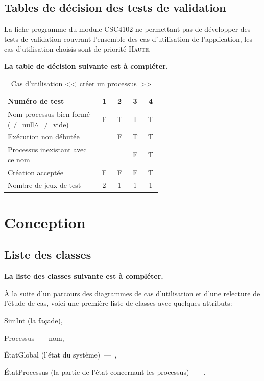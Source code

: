 \documentclass[11pt,article]{article}
\newcommand{\nullvalue}{\textsf{null}\xspace}
\begin{document}
\subsection{Tables de décision des tests de validation}

La fiche programme du module CSC4102 ne permettant pas de développer
des tests de validation couvrant l'ensemble des cas d'utilisation de
l'application, les cas d'utilisation choisis sont de priorité
\textsc{Haute}.

{\color{red}\textbf{La table de décision suivante est à compléter.}}

\begin{table}[htbp!]
\begin{tabular}{|p{0.6\linewidth}|c|c|c|c|}
\hline
Numéro de test
&1&2&3&4\\
\hline
\hline
Nom processus bien formé ($\neq$ \nullvalue $\land$ $\neq$ vide)
&F&T&T&T\\
\hline
Exécution non débutée
& &F&T&T\\
\hline
Processus inexistant avec ce nom
& & &F&T\\
\hline
\hline
Création acceptée
&F&F&F&T\\
\hline
\hline
Nombre de jeux de test 
&2&1&1&1\\
\hline
\end{tabular}
\caption{Cas d'utilisation <<~créer un processus~>>}
\end{table}

\newpage

\section{Conception}

\subsection{Liste des classes}

{\color{red}\textbf{La liste des classes suivante est à compléter.}}

À la suite d'un parcours des diagrammes de cas d'utilisation et d'une
relecture de l'étude de cas, voici une première liste de classes avec
quelques attributs:
\begin{compactitem}
\item \textsf{SimInt} (la façade),
\item \textsf{Processus}~---~nom,
\item \textsf{ÉtatGlobal} (l'état du système)~---~,
\item \textsf{ÉtatProcessus} (la partie de l'état concernant les processus)~---~.
\end{compactitem}
\newpage
\end{document}
